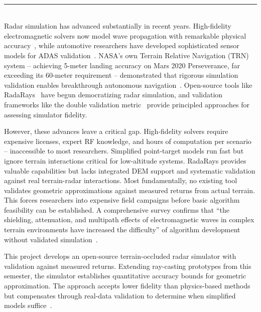 \documentclass[12pt]{article}
\newcommand{\sect}[1]{\noindent{\color{garnet}\textbf{\textsc{#1}}.}}
\begin{document}
\sloppy

\\[-0.8em]
{\color{garnet}\rule{\textwidth}{0.5pt}}\\[0.2em]
\sect{Project Overview} Radar simulation has advanced substantially in recent years. High-fidelity electromagnetic solvers now model wave propagation with remarkable physical accuracy~\cite{meyer2024}, while automotive researchers have developed sophisticated sensor models for ADAS validation~\cite{muckenhuber2023, holder2018}. NASA's own Terrain Relative Navigation (TRN) system -- achieving 5-meter landing accuracy on Mars 2020 Perseverance, far exceeding its 60-meter requirement -- demonstrated that rigorous simulation validation enables breakthrough autonomous navigation~\cite{chen2023mars, bruzzone2016trn}. Open-source tools like RadaRays~\cite{mock2024radarays} have begun democratizing radar simulation, and validation frameworks like the double validation metric~\cite{elster2024dvm} provide principled approaches for assessing simulator fidelity.

However, these advances leave a critical gap. High-fidelity solvers require expensive licenses, expert RF knowledge, and hours of computation per scenario -- inaccessible to most researchers. Simplified point-target models run fast but ignore terrain interactions critical for low-altitude systems. RadaRays provides valuable capabilities but lacks integrated DEM support and systematic validation against real terrain-radar interactions. Most fundamentally, no existing tool validates geometric approximations against measured returns from actual terrain. This forces researchers into expensive field campaigns before basic algorithm feasibility can be established. A comprehensive survey confirms that ``the shielding, attenuation, and multipath effects of electromagnetic waves in complex terrain environments have increased the difficulty'' of algorithm development without validated simulation~\cite{khawaja2025uav, wu2022uav}.

This project develops an open-source terrain-occluded radar simulator with validation against measured returns. Extending ray-casting prototypes from this semester, the simulator establishes quantitative accuracy bounds for geometric approximation. The approach accepts lower fidelity than physics-based methods but compensates through real-data validation to determine when simplified models suffice~\cite{bialer2024radsimreal}.
\end{document}
